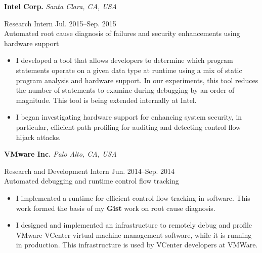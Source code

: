 \documentclass[10pt]{article}
\newcommand{\mysub}[3]{\textbf{#1} {#2} \hfill {\em #3}}
\newcommand{\myssub}[1]{\hspace*{2mm}\parbox{163mm}{#1}\vspace*{2mm}}
\begin{document}
\mysub{Intel Corp.}{}{Santa Clara, CA, USA} \\
\myssub{\vspace{1mm}Research Intern \hfill Jul. 2015--Sep. 2015\\
Automated root cause diagnosis of failures and security enhancements using hardware support
\vspace{-1mm}
\begin{itemize}
\setlength\itemsep{0em}
\item{I developed a tool that allows developers to determine which program statements operate on a given data type at runtime using a mix of static program analysis and hardware support. In our experiments, this tool reduces the number of statements to examine during debugging by an order of magnitude. This tool is being extended internally at Intel.}
\item{I began investigating hardware support for enhancing system security, in particular, efficient path profiling for auditing and detecting control flow hijack attacks.}
\end{itemize}
\vspace{-2mm}
}

\newpage

\mysub{VMware Inc.}{}{Palo Alto, CA, USA} \\
\myssub{\vspace{1mm}Research and Development Intern \hfill Jun. 2014--Sep. 2014\\
Automated debugging and runtime control flow tracking
\vspace{-1mm}
\begin{itemize}
\setlength\itemsep{0em}
\item{I implemented a runtime for efficient control flow tracking in software. This work formed the basis of my \textbf{Gist} work on root cause diagnosis.}
\item{I designed and implemented an infrastructure to remotely debug and profile VMware VCenter virtual machine management software, while it is running in production. This infrastructure is used by VCenter developers at VMWare.}
\end{itemize}
\vspace{-2mm}
}
\end{document}
